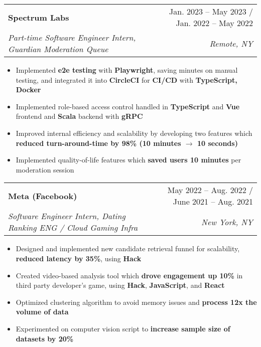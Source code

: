 \documentclass[letterpaper,11pt]{article}
\makeatletter
\newcommand{\resumeItem}[1]{
  \item\small{
    {#1 \vspace{-2pt}}
  }
}
\newcommand{\resumeSubheading}[4]{
  \vspace{-2pt}\item
    \begin{tabular*}{0.97\textwidth}[t]{l@{\extracolsep{\fill}}r}
      \textbf{#1} & #2 \\
      \textit{\small#3} & \textit{\small #4} \\
    \end{tabular*}\vspace{-7pt}
}
\newcommand{\resumeSubSubheading}[2]{
    \item
    \begin{tabular*}{0.97\textwidth}{l@{\extracolsep{\fill}}r}
      \textit{\small#1} & \textit{\small #2} \\
    \end{tabular*}\vspace{-7pt}
}
\newcommand{\resumeSubHeadingListEnd}{\end{itemize}}
\newcommand{\resumeItemListStart}{\begin{itemize}}
\newcommand{\resumeItemListEnd}{\end{itemize}\vspace{-5pt}}
\makeatother
\begin{document}
    \resumeSubheading
      {Spectrum Labs}{Jan. 2023 -- May 2023 / Jan. 2022 -- May 2022}
      {Part-time Software Engineer Intern, Guardian Moderation Queue}{Remote, NY}
      \resumeItemListStart
        \resumeItem{Implemented \textbf{e2e testing} with \textbf{Playwright}, saving minutes on manual testing, and integrated it into \textbf{CircleCI} for \textbf{CI/CD }with \textbf{TypeScript, Docker}}
        \resumeItem{Implemented role-based access control handled in \textbf{TypeScript} and \textbf{Vue} frontend and \textbf{Scala} backend with \textbf{gRPC}}
        \resumeItem{Improved internal efficiency and scalability by developing two features which \textbf{reduced turn-around-time by 98\% (10 minutes $\rightarrow$ 10 seconds)}}
        \resumeItem{Implemented quality-of-life features which \textbf{saved users 10 minutes} per moderation session}
      \resumeItemListEnd
      

    \resumeSubheading
      {Meta (Facebook)}{May 2022 -- Aug. 2022 / June 2021 -- Aug. 2021}
      {Software Engineer Intern, Dating Ranking ENG / Cloud Gaming Infra}{New York, NY}
      \resumeItemListStart
        \resumeItem{Designed and implemented new candidate retrieval funnel for scalability, \textbf{reduced latency by 35\%}, using \textbf{Hack}}
        \resumeItem{Created video-based analysis tool which \textbf{drove engagement up 10\%} in third party developer's game, using \textbf{Hack}, \textbf{JavaScript}, and \textbf{React}}
        \resumeItem{Optimized clustering algorithm to avoid memory issues and \textbf{process 12x the volume of data}}
        \resumeItem{Experimented on computer vision script to \textbf{increase sample size of datasets by 20\%}}
    \resumeItemListEnd

\end{document}
